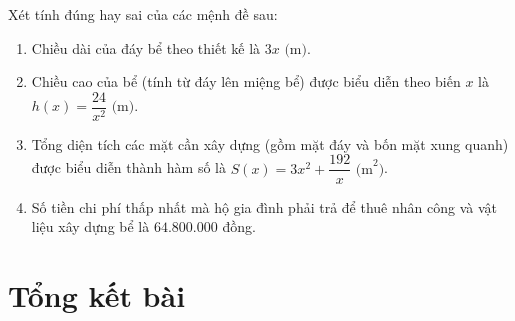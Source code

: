 \documentclass[12pt]{article}
\begin{document}
\begin{enumerate}[label=\textbf{Câu \arabic*.}]
\begin{center}
		\end{center}
		Xét tính đúng hay sai của các mệnh đề sau:
		\begin{enumerate}[label=\alph*)]
			\item Chiều dài của đáy bể theo thiết kế là $3x\text{ (m)}$.
			\item Chiều cao của bể (tính từ đáy lên miệng bể) được biểu diễn theo biến $x$ là $h(x) = \dfrac{24}{x^2}\text{ (m)}$.
			\item Tổng diện tích các mặt cần xây dựng (gồm mặt đáy và bốn mặt xung quanh) được biểu diễn thành hàm số là $S(x) = 3x^2 + \dfrac{192}{x}\text{ (m}^2)$.
			\item Số tiền chi phí thấp nhất mà hộ gia đình phải trả để thuê nhân công và vật liệu xây dựng bể là $64.800.000$ đồng.
		\end{enumerate}
		
		
	\end{enumerate}
	
	\section{Tổng kết bài}
	
\end{document}

